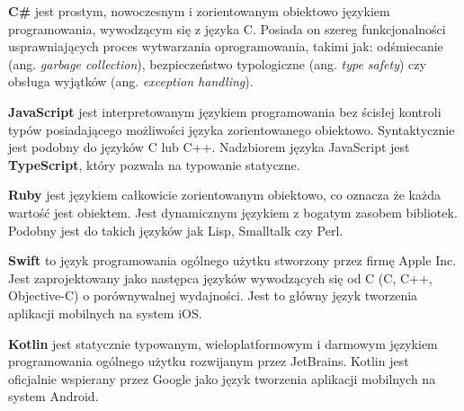 \textbf{C\#} jest prostym, nowoczesnym i zorientowanym obiektowo językiem programowania, wywodzącym się z języka C. Posiada on szereg funkcjonalności usprawniających proces wytwarzania oprogramowania, takimi jak: odśmiecanie (ang. \textit{garbage collection}), bezpieczeństwo typologiczne (ang. \textit{type safety}) czy obsługa wyjątków (ang. \textit{exception handling}).\cite{wagner_wenzel_latham_onderka_2016}


\textbf{JavaScript} jest interpretowanym językiem programowania bez ścisłej kontroli typów posiadającego możliwości języka zorientowanego obiektowo. Syntaktycznie jest podobny do języków C lub C++.\cite{davidflanagan2006} Nadzbiorem języka JavaScript jest \textbf{TypeScript}, który pozwala na typowanie statyczne.


\textbf{Ruby} jest językiem całkowicie zorientowanym obiektowo, co oznacza że każda wartość jest obiektem. Jest dynamicznym językiem z bogatym zasobem bibliotek. Podobny jest do takich języków jak Lisp, Smalltalk czy Perl.\cite{davidflanaganyukihiromatsimoto2008}


\textbf{Swift} to język programowania ogólnego użytku stworzony przez firmę Apple Inc. Jest zaprojektowany jako następca języków wywodzących się od C (C, C++, Objective-C) o porównywalnej wydajności. Jest to główny język tworzenia aplikacji mobilnych na system iOS.\cite{swift}


\textbf{Kotlin} jest statycznie typowanym, wieloplatformowym i darmowym językiem programowania ogólnego użytku rozwijanym przez JetBrains.\cite{kotlin} Kotlin jest oficjalnie wspierany przez Google jako język tworzenia aplikacji mobilnych na system Android.\cite{kotlingoogle}

